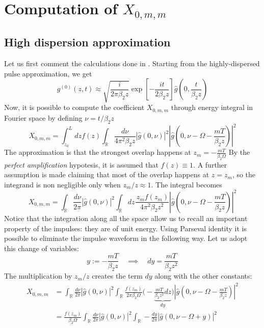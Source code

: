 \documentclass[10pt, lettersize, journal, onecolumn]{IEEEtran}
\begin{document}
\section{Computation of $X_{0, m, m}$} \label{approx}
	\subsection{High dispersion approximation}
Let us first comment the calculations done in \cite[eq. 11, 12]{Dar_2013}. Starting from the highly-dispersed pulse approximation, we get
\begin{equation}\label{eq:papoulis}
	g^{(0)}(z, t) \approx \sqrt{\frac{i}{2\pi \beta_2 z}} \exp\left[-\frac{it}{2 \beta_2 z}\right] \hat{g}\left(0, \frac{t}{\beta_2 z}\right)	
\end{equation}
Now, it is possible to compute the coefficient $X_{0, m, m}$ through energy integral in Fourier space by defining $\nu = t/\beta_2 z$
\begin{equation}
	X_{0, m, m} = \int_{z_0}^{L} dz f(z) \int_{\mathbb{R}} \frac{d\nu}{4\pi^2 \beta_2 z} |\hat{g}(0, \nu)|^2 \left|\hat{g}\left(0, \nu-\Omega-\frac{mT}{\beta_2 z}\right)\right|^2
\end{equation}
The approximation is that the strongest overlap happens at $z_m = -\frac{mT}{\beta_2 \Omega}$
By the \textit{perfect amplification} hypotesis, it is assumed that $f(z) \equiv 1$. A further assumption is made claiming that most of the overlap happens at $z=z_m$, so the integrand is non negligible only when $z_m/z \approx 1$. 
The integral becomes
\begin{equation}
	X_{0, m, m} = \int_{\mathbb{R}} \frac{d\nu}{2\pi}  |\hat{g}(0, \nu)|^2 \int_{\mathbb{R}} dz\frac{\, z_m f(z_m)}{4\pi^2 \beta_2 z^2}\left|\hat{g}\left(0, \nu-\Omega-\frac{mT}{\beta_2 z}\right)\right|^2
\end{equation}
Notice that the integration along all the space allow us to recall an important property of the impulses: they are of unit energy. Using Parseval identity it is possible to eliminate the impulse waveform in the following way.
Let us adopt this change of variables:
\begin{equation}
	y:= -\frac{mT}{\beta_2 z} \quad \implies \quad dy = \frac{mT}{\beta_2 z^2}
\end{equation}
The multiplication by $z_m/z$ creates the term $dy$ along with the other constants:
\begin{align}
	X_{0, m, m} &= \int_{\mathbb{R}} \frac{d\nu}{2\pi}  |\hat{g}(0, \nu)|^2 \int_{\mathbb{R}} \frac{f(z_m)}{2\pi \beta_2 \Omega}  \Big(-\underbrace{\frac{mT}{\beta_2 z^2} dz}_{dy}\Big) \left|\hat{g}\left(0, \nu-\Omega-\frac{mT}{\beta_2 z}\right)\right|^2 \\
	&=  \frac{f(z_m)}{ \beta_2 \Omega}\int_{\mathbb{R}} \frac{d\nu}{2\pi}  |\hat{g}(0, \nu)|^2 \int_{\mathbb{R}} - \frac{dy}{2\pi} \left|\hat{g}\left(0, \nu-\Omega + y \right)\right|^2
\end{align}
\end{document}

